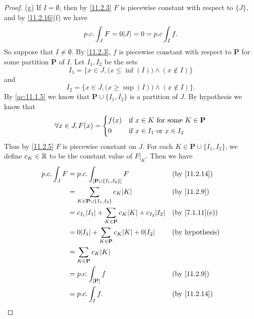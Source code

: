 \begin{proof}{(g)}
  If \(I = \emptyset\), then by \cref{11.2.3} \(F\) is piecewise constant with respect to \(\{J\}\), and by \cref{11.2.16}(f) we have
  \[
    p.c. \int_J F = 0 \abs{J} = 0 = p.c \int_I f.
  \]
  So suppose that \(I \neq \emptyset\).
  By \cref{11.2.3}, \(f\) is piecewise constant with respect to \(\mathbf{P}\) for some partition \(\mathbf{P}\) of \(I\).
  Let \(I_1, I_2\) be the sets
  \[
    I_1 = \Big\{x \in J, \big(x \leq \inf(I)\big) \land (x \notin I)\Big\}
  \]
  and
  \[
    I_2 = \Big\{x \in J, \big(x \geq \sup(I)\big) \land (x \notin I)\Big\}.
  \]
  By \cref{ac:11.1.5} we know that \(\mathbf{P} \cup \{I_1, I_2\}\) is a partition of \(J\).
  By hypothesis we know that
  \[
    \forall x \in J, F(x) = \begin{dcases}
      f(x) & \text{if } x \in K \text{ for some } K \in \mathbf{P} \\
      0    & \text{if } x \in I_1 \text{ or } x \in I_2
    \end{dcases}
  \]
  Thus by \cref{11.2.5} \(F\) is piecewise constant on \(J\).
  For each \(K \in \mathbf{P} \cup \{I_1, I_2\}\), we define \(c_K \in \mathbb{R}\) to be the constant value of \(F|_K\).
  Then we have
  \begin{align*}
    p.c. \int_J F & = p.c. \int_{[\mathbf{P} \cup \{I_1, I_2\}]} F                                &  & \text{(by \cref{11.2.14})}   \\
                  & = \sum_{K \in \mathbf{P} \cup \{I_1, I_2\}} c_K \abs{K}                       &  & \text{(by \cref{11.2.9})}    \\
                  & = c_{I_1} \abs{I_1} + \sum_{K \in \mathbf{P}} c_K \abs{K} + c_{I_2} \abs{I_2} &  & \text{(by \cref{7.1.11}(e))} \\
                  & = 0 \abs{I_1} + \sum_{K \in \mathbf{P}} c_K \abs{K} + 0 \abs{I_2}             &  & \text{(by hypothesis)}       \\
                  & = \sum_{K \in \mathbf{P}} c_K \abs{K}                                                                           \\
                  & = p.c. \int_{[\mathbf{P}]} f                                                  &  & \text{(by \cref{11.2.9})}    \\
                  & = p.c. \int_I f.                                                              &  & \text{(by \cref{11.2.14})}
  \end{align*}
\end{proof}

